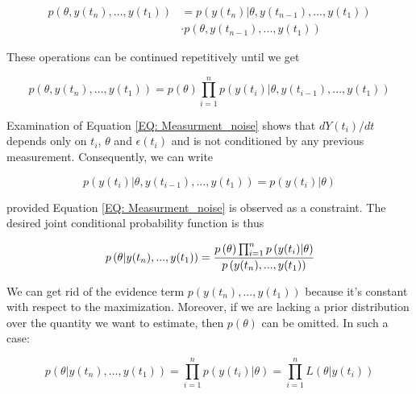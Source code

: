 \documentclass[../Article_Model_Parameters.tex]{subfiles}
\begin{document}
{\footnotesize
	\begin{equation}
		\begin{split}
			p\left( \theta,y(t_n),...,y(t_1) \right) &= p\left( y(t_n)|\theta,y(t_{n-1}),...,y(t_1) \right) \\ &\cdot p\left( \theta,y(t_{n-1}),...,y(t_1) \right)
		\end{split}
\end{equation} }

These operations can be continued repetitively until we get

{\footnotesize
	\begin{equation}
		p\left( \theta, y(t_n),...,y(t_1) \right) = p\left( \theta \right) \prod_{i=1}^{n} p\left( y(t_i)|\theta, y(t_{i-1}),...,y(t_1) \right)
\end{equation} }

Examination of Equation \ref{EQ: Measurment_noise} shows that $ d Y(t_i) / dt$ depends only on $t_i$, $\theta$ and $\epsilon(t_i)$ and is not conditioned by any previous measurement. Consequently, we can write 

{\footnotesize
	\begin{equation}
		p\left( y(t_i)|\theta, y(t_{i-1}),...,y(t_1) \right) = p\left( y(t_i)|\theta \right)
\end{equation} }

provided Equation \ref{EQ: Measurment_noise} is observed as a constraint. The desired joint conditional probability function is thus

{\footnotesize
	\begin{equation}
		p\left( \theta| y(t_n),...,y(t_1) \right) = \cfrac{p\left( \theta \right) \prod_{i=1}^{n} p\left( y(t_i)|\theta \right) }{p\left( y(t_n),...,y(t_1) \right)}
\end{equation} }

We can get rid of the evidence term $p\left( y(t_n),...,y(t_1) \right)$ because it's constant with respect to the maximization. Moreover, if we are lacking a prior distribution over the quantity we want to estimate, then $p(\theta)$ can be omitted. In such a case:

{\footnotesize
	\begin{equation}
		p\left( \theta| y(t_n),...,y(t_1) \right) = \prod_{i=1}^{n} p\left( y(t_i)|\theta \right) = \prod_{i=1}^{n} L\left( \theta|y(t_i) \right) 
\end{equation} }

\end{document}
